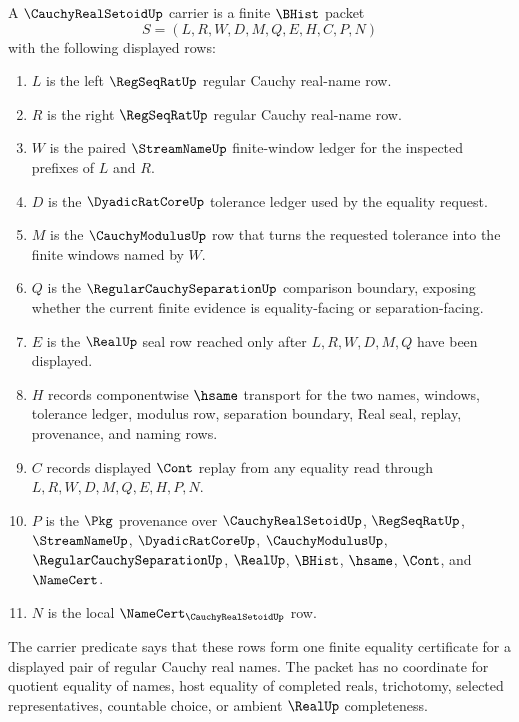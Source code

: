 \begin{definition}
\label{def:cauchy-real-setoid-carrier}
A $\CauchyRealSetoidUp$ carrier is a finite $\BHist$ packet
$$
S=(L,R,W,D,M,Q,E,H,C,P,N)
$$
with the following displayed rows:
\begin{enumerate}
\item $L$ is the left $\RegSeqRatUp$ regular Cauchy real-name row.
\item $R$ is the right $\RegSeqRatUp$ regular Cauchy real-name row.
\item $W$ is the paired $\StreamNameUp$ finite-window ledger for the inspected prefixes of $L$ and $R$.
\item $D$ is the $\DyadicRatCoreUp$ tolerance ledger used by the equality request.
\item $M$ is the $\CauchyModulusUp$ row that turns the requested tolerance into the finite windows named by $W$.
\item $Q$ is the $\RegularCauchySeparationUp$ comparison boundary, exposing whether the current finite evidence is equality-facing or separation-facing.
\item $E$ is the $\RealUp$ seal row reached only after $L,R,W,D,M,Q$ have been displayed.
\item $H$ records componentwise $\hsame$ transport for the two names, windows, tolerance ledger, modulus row, separation boundary, Real seal, replay, provenance, and naming rows.
\item $C$ records displayed $\Cont$ replay from any equality read through $L,R,W,D,M,Q,E,H,P,N$.
\item $P$ is the $\Pkg$ provenance over $\CauchyRealSetoidUp$, $\RegSeqRatUp$, $\StreamNameUp$, $\DyadicRatCoreUp$, $\CauchyModulusUp$, $\RegularCauchySeparationUp$, $\RealUp$, $\BHist$, $\hsame$, $\Cont$, and $\NameCert$.
\item $N$ is the local $\NameCert_{\CauchyRealSetoidUp}$ row.
\end{enumerate}
The carrier predicate says that these rows form one finite equality certificate for a displayed pair of regular Cauchy real names. The packet has no coordinate for quotient equality of names, host equality of completed reals, trichotomy, selected representatives, countable choice, or ambient $\RealUp$ completeness.
\end{definition}

